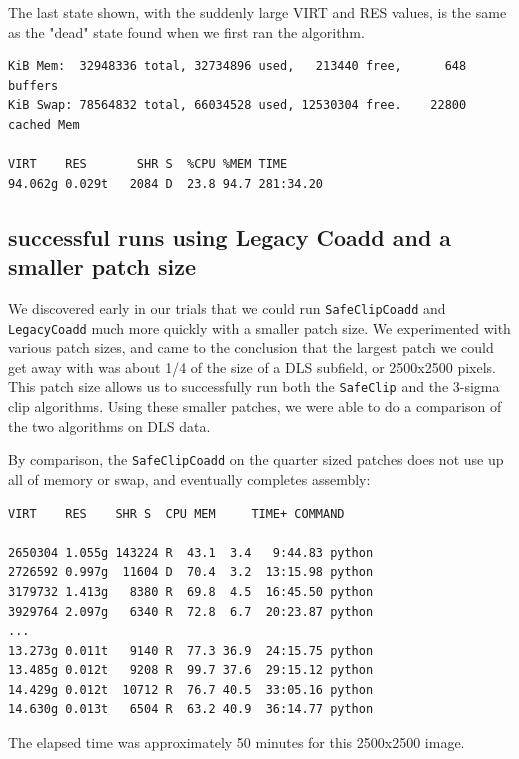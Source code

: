 \documentclass[DM,toc]{lsstdoc}
\begin{document}
The last state shown, with the suddenly large VIRT and RES values, is the same as the "dead" state found when we first ran the algorithm.

\begin{small}
\begin{verbatim}
KiB Mem:  32948336 total, 32734896 used,   213440 free,      648 buffers
KiB Swap: 78564832 total, 66034528 used, 12530304 free.    22800 cached Mem

VIRT    RES       SHR S  %CPU %MEM TIME
94.062g 0.029t   2084 D  23.8 94.7 281:34.20
\end{verbatim}
\end{small}

\subsection{successful runs using Legacy Coadd and a smaller patch size}
We discovered early in our trials that we could run {\tt\string SafeClipCoadd} and {\tt\string LegacyCoadd} much more quickly with a smaller patch size. We experimented with various patch sizes, and came to the conclusion that the largest patch we could get away with was about 1/4 of the size of a DLS subfield, or 2500x2500 pixels. This patch size allows us to successfully run both the {\tt\string SafeClip} and the 3-sigma clip algorithms. Using these smaller patches, we were able to do a comparison of the two algorithms on DLS data.

By comparison, the {\tt\string SafeClipCoadd} on the quarter sized patches does not use up all of memory or swap, and eventually completes assembly:
\begin{small}
\begin{verbatim}
VIRT    RES    SHR S  CPU MEM     TIME+ COMMAND

2650304 1.055g 143224 R  43.1  3.4   9:44.83 python
2726592 0.997g  11604 D  70.4  3.2  13:15.98 python
3179732 1.413g   8380 R  69.8  4.5  16:45.50 python
3929764 2.097g   6340 R  72.8  6.7  20:23.87 python
...
13.273g 0.011t   9140 R  77.3 36.9  24:15.75 python
13.485g 0.012t   9208 R  99.7 37.6  29:15.12 python
14.429g 0.012t  10712 R  76.7 40.5  33:05.16 python
14.630g 0.013t   6504 R  63.2 40.9  36:14.77 python
\end{verbatim}
\end{small}
The elapsed time was approximately 50 minutes for this 2500x2500 image.
\end{document}
